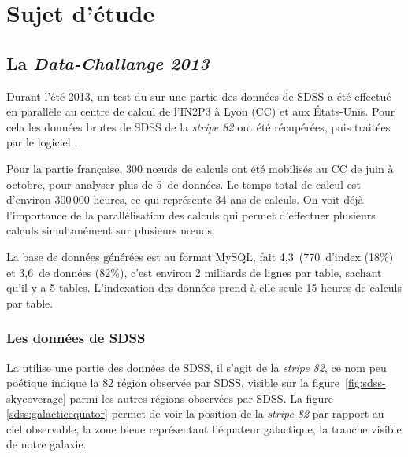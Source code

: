 \section{Sujet d'étude}

	\subsection{La \emph{Data-Challange 2013}}

Durant l'été 2013, un test du \stack{} sur une partie des données de SDSS a été effectué en parallèle au centre de calcul de l'IN2P3 à Lyon (CC) et aux États-Unis. Pour cela les données brutes de SDSS de la \emph{stripe 82} ont été récupérées, puis traitées par le logiciel \stack.

Pour la partie française, 300 nœuds de calculs ont été mobilisés au CC de juin à octobre, pour analyser plus de 5\,\To{} de données. Le temps total de calcul est d'environ 300\,000 heures, ce qui représente 34 ans de calculs. On voit déjà l'importance de la parallélisation des calculs qui permet d'effectuer plusieurs calculs simultanément sur plusieurs nœuds.

La base de données générées est au format MySQL, fait 4,3\,\To{} (770\,\Go{} d'index (18\%) et 3,6\,\To{} de données (82\%), c'est environ 2 milliards de lignes par table, sachant qu'il y a 5 tables. L'indexation des données prend à elle seule 15 heures de calculs par table.

		\subsubsection{Les données de SDSS}
La \DC{} utilise une partie des données de SDSS, il s'agit de la \emph{stripe 82}, ce nom peu poétique indique la 82 région observée par SDSS, visible sur la figure~\ref{fig:sdss-skycoverage} parmi les autres régions observées par SDSS. La figure \ref{sdss:galacticequator} permet de voir la position de la \emph{stripe 82} par rapport au ciel observable, la zone bleue représentant l'équateur galactique, \ie{} la tranche visible de notre galaxie.

